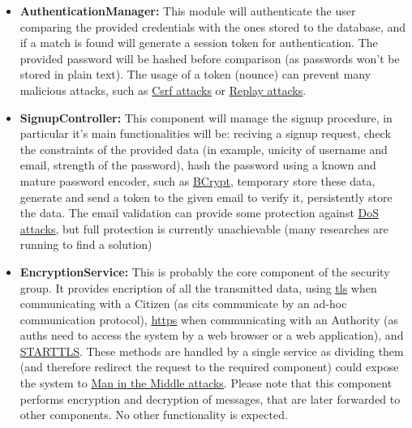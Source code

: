 \documentclass{article}
\newcommand{\link}[2]{{\color{blue}\underline{\href{#1}{#2}}}}
\begin{document}
	\begin{itemize}
		\item \label{component:AuthenticationManager} \textbf{AuthenticationManager:}
			This module will authenticate the user comparing the provided credentials with the ones stored to the database, and if a match is found
			will generate a session token for authentication. The provided password will be hashed before comparison (as passwords won't be stored
			in plain text). The usage of a token (nounce) can prevent many malicious attacks, such as 
		 	\link{https://en.wikipedia.org/wiki/Cross-site_request_forgery}{Csrf attacks} or 
			\link{https://en.wikipedia.org/wiki/Replay_attack}{Replay attacks}. 
		 \item \label{component:SignupController} \textbf{SignupController:} 
		 	This component will manage the signup procedure, in particular it's main functionalities will be: reciving a signup request, check the
		 	constraints of the provided data (in example, unicity of username and email, strength of the password), hash the password using a known
		 	and mature password encoder, such as \link{https://en.wikipedia.org/wiki/Bcrypt}{BCrypt}, temporary store these data, generate and send a
		 	token to the given email to verify it, persistently store the data. The email validation can provide some protection against
		 	\link{https://en.wikipedia.org/wiki/Denial-of-service_attack}{DoS attacks}, but full protection is
		 	currently unachievable (many researches are running to find a solution)
		 \item \label{component:EncryptionService} \textbf{EncryptionService:}
		 	This is probably the core component of the security group. It provides encription of all the transmitted data, using 
		 	\link{https://en.wikipedia.org/wiki/Transport_Layer_Security}{tls} when communicating with a Citizen (as cits communicate by an ad-hoc
		 	communication protocol), \link{https://en.wikipedia.org/wiki/HTTPS}{https} when communicating with an Authority (as auths need to
		 	access the system by a web browser or a web application), and \link{https://en.wikipedia.org/wiki/Opportunistic_TLS}{STARTTLS}. 
		 	These methods are handled by a single service as dividing them (and therefore redirect the request to the required component) could
		 	expose the system to \link{https://en.wikipedia.org/wiki/Man-in-the-middle_attack}{Man in the Middle attacks}. 
		 	Please note that this component performs encryption and decryption of messages, that are later forwarded to other components. 
		 	No other functionality is expected.

\end{itemize}
\end{document}
